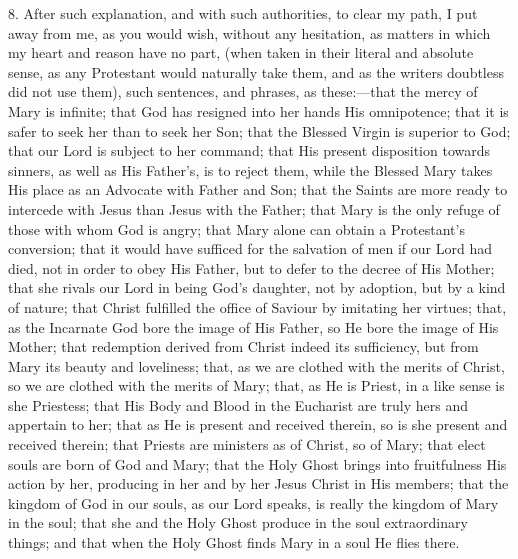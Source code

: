 8. After such explanation, and with such authorities, to clear my
path, I put away from me, as you would wish, without any hesitation, as
matters in which my heart and reason have no part, (when taken in their
literal and absolute sense, as any Protestant would naturally take them,
and as the writers doubtless did not use them), such sentences, and
phrases, as these:—that the mercy of Mary is infinite; that God has
resigned into her hands His omnipotence; that it is safer to seek her
than to seek her Son; that the Blessed Virgin is superior to God; that
our Lord is subject to her command; that His present disposition towards
sinners, as well as His Father's, is to reject them, while the Blessed
Mary takes His place as an Advocate with Father and Son; that the Saints
are more ready to intercede with Jesus than Jesus with the Father; that
Mary is the only refuge of those with whom God is angry; that Mary alone
can obtain a Protestant's conversion; that it would have sufficed for
the salvation of men if our Lord had died, not in order to obey His
Father, but to defer to the decree of His Mother; that she rivals our
Lord in being God's daughter, not by adoption, but by a kind of nature;
that Christ fulfilled the office of Saviour by imitating her virtues;
that, as the Incarnate God bore the image of His Father, so He bore the
image of His Mother; that redemption derived from Christ indeed
its sufficiency, but from Mary its beauty and loveliness; that, as we
are clothed with the merits of Christ, so we are clothed with the merits
of Mary; that, as He is Priest, in a like sense is she Priestess; that
His Body and Blood in the Eucharist are truly hers and appertain to her;
that as He is present and received therein, so is she present and
received therein; that Priests are ministers as of Christ, so of Mary;
that elect souls are born of God and Mary; that the Holy Ghost brings
into fruitfulness His action by her, producing in her and by her Jesus
Christ in His members; that the kingdom of God in our souls, as our Lord
speaks, is really the kingdom of Mary in the soul; that she and the Holy
Ghost produce in the soul extraordinary things; and that when the Holy
Ghost finds Mary in a soul He flies there.

